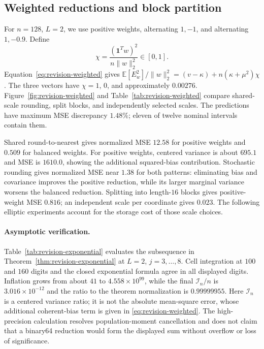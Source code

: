 \subsection{Weighted reductions and block partition}
For $n=128$, $L=2$, we use positive weights, alternating $1,-1$,
and alternating $1,-0.9$. Define
\begin{equation}\label{eq:weight-imbalance}
 \chi=\frac{(\mathbf1^Tw)^2}{n\|w\|_2^2}\in[0,1].
\end{equation}
Equation~\eqref{eq:revision-weighted} gives
$\mathbb E[E_w^2]/\|w\|_2^2=(v-\kappa)+n(\kappa+\mu^2)\chi$.
The three vectors have $\chi=1$, $0$, and approximately $0.00276$.
Figure~\ref{fig:revision-weighted} and Table~\ref{tab:revision-weighted}
compare shared-scale rounding, split blocks, and independently selected
scales. The predictions have maximum MSE discrepancy $1.48\%$; eleven
of twelve nominal intervals contain them.




Shared round-to-nearest gives normalized MSE $12.58$ for positive
weights and $0.509$ for balanced weights. For positive weights,
centered variance is about $695.1$ and MSE is $1610.0$, showing the
additional squared-bias contribution. Stochastic rounding gives
normalized MSE near $1.38$ for both patterns: eliminating bias and
covariance improves the positive reduction, while its larger marginal
variance worsens the balanced reduction.
Splitting into length-$16$ blocks gives positive-weight MSE $0.816$;
an independent scale per coordinate gives $0.023$. The following
elliptic experiments account for the storage cost of those scale choices.

\paragraph{Asymptotic verification.}
Table~\ref{tab:revision-exponential} evaluates the subsequence in
Theorem~\ref{thm:revision-exponential} at $L=2$, $j=3,\ldots,8$.
Cell integration at $100$ and $160$ digits and the closed exponential
formula agree in all displayed digits. Inflation grows from about $41$
to $4.558\times10^{99}$, while the final $\mathcal I_n/n$ is
$3.016\times10^{-12}$ and the ratio to the theorem normalization is
$0.99999955$.
Here $\mathcal I_n$ is a centered variance ratio; it is not the absolute
mean-square error, whose additional coherent-bias term is given in
\eqref{eq:revision-weighted}. The high-precision calculation resolves
population-moment cancellation and does not claim that a binary64 reduction
would form the displayed sum without overflow or loss of significance.







